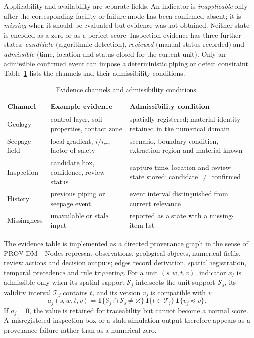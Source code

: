 \documentclass[journal]{IEEEtran}
\begin{document}
Applicability and availability are separate fields. An indicator is \emph{inapplicable} only after the corresponding facility or failure mode has been confirmed absent; it is \emph{missing} when it should be evaluated but evidence was not obtained. Neither state is encoded as a zero or as a perfect score. Inspection evidence has three further states: \emph{candidate} (algorithmic detection), \emph{reviewed} (manual status recorded) and \emph{admissible} (time, location and status closed for the current unit). Only an admissible confirmed event can impose a deterministic piping or defect constraint. Table~\ref{tab:evidence} lists the channels and their admissibility conditions.

\begin{table}[t]
\caption{Evidence channels and admissibility conditions.}
\label{tab:evidence}
\centering
\footnotesize
\setlength{\tabcolsep}{3pt}
\begin{tabular}{@{}>{\raggedright\arraybackslash}p{}>{\raggedright\arraybackslash}p{}>{\raggedright\arraybackslash}p{}@{}}
\toprule
Channel & Example evidence & Admissibility condition \\
\midrule
Geology & control layer, soil properties, contact zone & spatially registered; material identity retained in the numerical domain \\
Seepage field & local gradient, $i/i_{cr}$, factor of safety & scenario, boundary condition, extraction region and material known \\
Inspection & candidate box, confidence, review status & capture time, location and review state stored; candidate $\neq$ confirmed \\
History & previous piping or seepage event & event interval distinguished from current relevance \\
Missingness & unavailable or stale input & reported as a state with a missing-item list \\
\bottomrule
\end{tabular}
\end{table}

The evidence table is implemented as a directed provenance graph in the sense of PROV-DM~\cite{PROVDM}. Nodes represent observations, geological objects, numerical fields, review actions and decision outputs; edges record derivation, spatial registration, temporal precedence and rule triggering. For a unit $(s,w,t,v)$, indicator $x_j$ is admissible only when its spatial support $\mathcal{S}_j$ intersects the unit support $\mathcal{S}_s$, its validity interval $\mathcal{T}_j$ contains $t$, and its version $v_j$ is compatible with $v$:
\begin{equation}
a_j(s,w,t,v)=\mathbf{1}\{\mathcal{S}_j\cap\mathcal{S}_s\neq\varnothing\}\,\mathbf{1}\{t\in\mathcal{T}_j\}\,\mathbf{1}\{v_j\preceq v\}.
\label{eq:admissibility}
\end{equation}
If $a_j=0$, the value is retained for traceability but cannot become a normal score. A misregistered inspection box or a stale simulation output therefore appears as a provenance failure rather than as a numerical zero.
\end{document}
